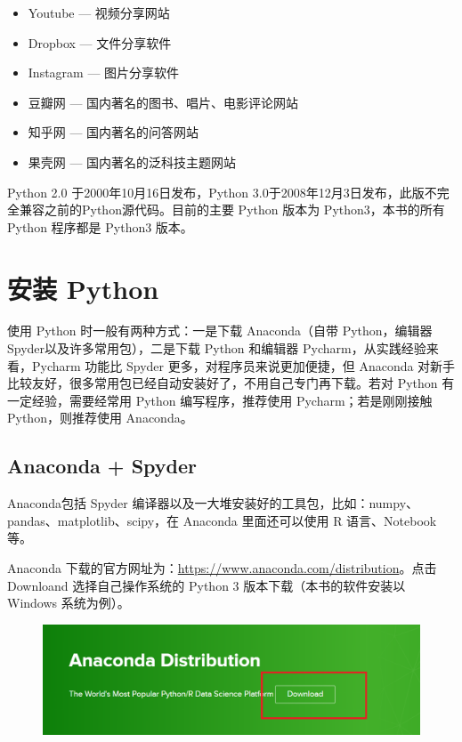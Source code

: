 \vspace{5pt}
\begin{itemize}
  \item Youtube --- 视频分享网站

  \item Dropbox --- 文件分享软件

  \item Instagram --- 图片分享软件


  \item 豆瓣网 --- 国内著名的图书、唱片、电影评论网站

  \item 知乎网 --- 国内著名的问答网站

  \item 果壳网 --- 国内著名的泛科技主题网站
\end{itemize}
\vspace{5pt}

Python 2.0 于2000年10月16日发布，Python 3.0于2008年12月3日发布，此版不完全兼容之前的Python源代码。目前的主要 Python 版本为 Python3，本书的所有 Python 程序都是 Python3 版本。

\section{安装 Python}

使用 Python 时一般有两种方式：一是下载 Anaconda（自带 Python，编辑器 Spyder以及许多常用包），二是下载 Python 和编辑器 Pycharm，从实践经验来看，Pycharm 功能比 Spyder 更多，对程序员来说更加便捷，但 Anaconda 对新手比较友好，很多常用包已经自动安装好了，不用自己专门再下载。若对 Python 有一定经验，需要经常用 Python 编写程序，推荐使用 Pycharm；若是刚刚接触 Python，则推荐使用 Anaconda。

\subsection{Anaconda + Spyder}

Anaconda包括 Spyder 编译器以及一大堆安装好的工具包，比如：numpy、pandas、matplotlib、scipy，在 Anaconda 里面还可以使用 R 语言、Notebook 等。

 Anaconda 下载的官方网址为：\href{https://www.anaconda.com/distribution}{https://www.anaconda.com/distribution}。点击 Downloand 选择自己操作系统的 Python 3 版本下载（本书的软件安装以 Windows 系统为例）。

\begin{figure}[!ht]
  \centering
  \includegraphics[scale=0.5]{figure/chapter1/anaconda.png}
\end{figure}

